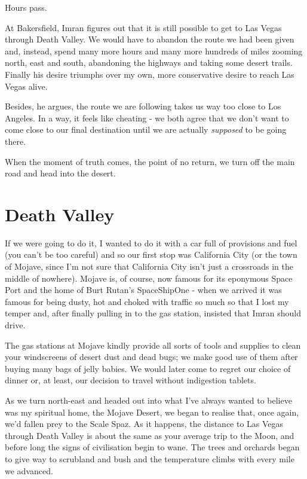 \documentclass[a5paper,titlepage,11pt]{book}
\begin{document}
Hours pass.

At Bakersfield, Imran figures out that it is still possible to get to Las Vegas through Death Valley. We would have to abandon the route we had been given and, instead, spend many more hours and many more hundreds of miles zooming north, east and south, abandoning the highways and taking some desert trails. Finally his desire triumphs over my own, more conservative desire to reach Las Vegas alive.

Besides, he argues, the route we are following takes us way too close to Los Angeles. In a way, it feels like cheating - we both agree that we don't want to come close to our final destination until we are actually \emph{supposed} to be going there.

When the moment of truth comes, the point of no return, we turn off the main road and head into the desert.


\section*{Death Valley}
If we were going to do it, I wanted to do it with a car full of provisions and fuel (you can't be too careful) and so our first stop was California City (or the town of Mojave, since I'm not sure that California City isn't just a crossroads in the middle of nowhere). Mojave is, of course, now famous for its eponymous Space Port and the home of Burt Rutan's SpaceShipOne - when we arrived it was famous for being dusty, hot and choked with traffic so much so that I lost my temper and, after finally pulling in to the gas station, insisted that Imran should drive.

The gas stations at Mojave kindly provide all sorts of tools and supplies to clean your windscreens of desert dust and dead bugs; we make good use of them after buying many bags of jelly babies. We would later come to regret our choice of dinner or, at least, our decision to travel without indigestion tablets.

As we turn north-east and headed out into what I've always wanted to believe was my spiritual home, the Mojave Desert, we began to realise that, once again, we'd fallen prey to the Scale Spaz. As it happens, the distance to Las Vegas through Death Valley is about the same as your average trip to the Moon, and before long the signs of civilisation begin to wane. The trees and orchards began to give way to scrubland and bush and the temperature climbs with every mile we advanced.
\end{document}
